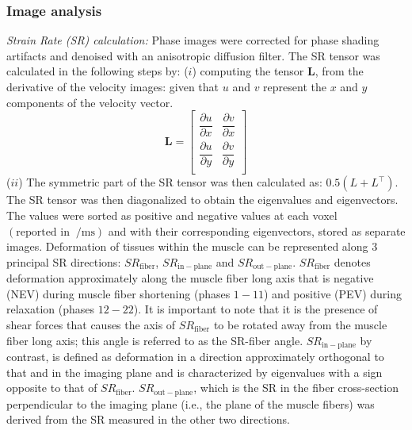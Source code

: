 \subsubsection{Image analysis}
\textit{Strain Rate (SR) calculation:}
Phase images were corrected for phase shading artifacts and denoised with an anisotropic diffusion filter. 
The SR tensor was calculated in the following steps by: ($i$) computing the tensor $\mathbf{L}$, from the derivative of the velocity images: given that $u$ and $v$ represent the $x$ and $y$ components of the velocity vector.
\begin{equation}\label{eq: StrainRate2d}
\mathbf{L} = \left [
\begin{matrix}
\dfrac{\partial{u}}{\partial{x}} & \dfrac{\partial{v}}{\partial{x}} \\[8pt]
\dfrac{\partial{u}}{\partial{y}} & \dfrac{\partial{v}}{\partial{y}} \\
\end{matrix} \right]
\end{equation}
($ii$) The symmetric part of the SR tensor was then calculated as: $0.5(L+L^\top)$. 
The SR tensor was then diagonalized to obtain the eigenvalues and eigenvectors.
The values were sorted as positive and negative values at each voxel $( \text{reported in }  \SI{}{\per\milli\second})$ and with their corresponding eigenvectors, stored as separate images. 
Deformation of tissues within the muscle can be represented along 3 principal SR directions: $SR_{\mathrm{fiber}}$, $SR_{\mathrm{in-plane}}$ and $SR_{\mathrm{out-plane}}$. $
SR_{\mathrm{fiber}}$ denotes deformation approximately along the muscle fiber long axis that is negative (NEV) during muscle fiber shortening (phases $1-11$) and positive (PEV) during relaxation (phases $12-22$). 
It is important to note that it is the presence of shear forces that causes the axis of $SR_{\mathrm{fiber}}$ to be rotated away from the muscle fiber long axis; this angle is referred to as the SR-fiber angle. 
$SR_{\mathrm{in-plane}}$ by contrast, is defined as deformation in a direction approximately orthogonal to that and in the imaging plane and is characterized by eigenvalues with a sign opposite to that of $SR_{\mathrm{fiber}}$. 
$SR_{\mathrm{out-plane}}$, which is the SR in the fiber cross-section perpendicular to the imaging plane (i.e., the plane of the muscle fibers) was derived from the SR measured in the other two directions. 
